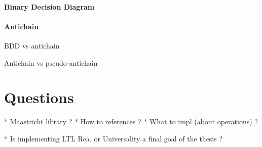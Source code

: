 \documentclass[letterpaper]{memoir}
\begin{document}
\paragraph{Binary Decision Diagram}

\paragraph{Antichain}

BDD vs antichain

Antichain vs pseudo-antichain

\section{Questions}

* Maastricht library ? \cite{acacia} \cite{aapal}
* How to references ?
* What to impl (about operations) ?

* Is implementing LTL Rea. or Universality a final goal of the thesis ?



\end{document}
